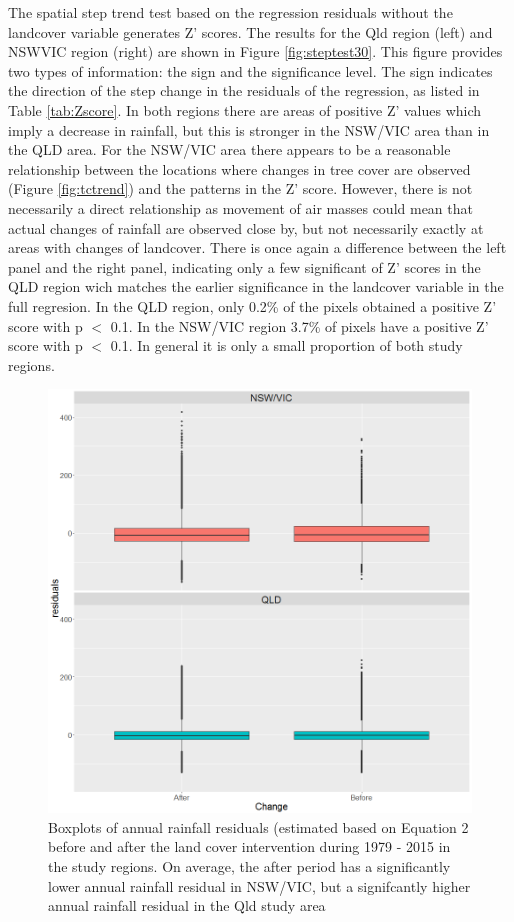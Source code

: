 \documentclass[fleqn,10pt,lineno]{wlpeerj} %
\begin{document}
The spatial step trend test based on the regression residuals without
the landcover variable generates Z' scores. The results for the Qld
region (left) and NSWVIC region (right) are shown in Figure
\ref{fig:steptest30}. This figure provides two types of information: the
sign and the significance level. The sign indicates the direction of the
step change in the residuals of the regression, as listed in Table
\ref{tab:Zscore}. In both regions there are areas of positive Z' values
which imply a decrease in rainfall, but this is stronger in the NSW/VIC
area than in the QLD area. For the NSW/VIC area there appears to be a
reasonable relationship between the locations where changes in tree
cover are observed (Figure \ref{fig:tctrend}) and the patterns in the Z'
score. However, there is not necessarily a direct relationship as
movement of air masses could mean that actual changes of rainfall are
observed close by, but not necessarily exactly at areas with changes of
landcover. There is once again a difference between the left panel and
the right panel, indicating only a few significant of Z' scores in the
QLD region wich matches the earlier significance in the landcover
variable in the full regresion. In the QLD region, only 0.2\% of the
pixels obtained a positive Z' score with p \(<\) 0.1. In the NSW/VIC
region 3.7\% of pixels have a positive Z' score with p \(<\) 0.1. In
general it is only a small proportion of both study regions.

\begin{figure}
\includegraphics[width=0.7\linewidth,height=0.7\textheight]{figures/ResidualBoxplotchange} \caption{Boxplots of annual rainfall residuals (estimated based on Equation 2 before and after the land cover intervention during 1979 - 2015 in the study regions. On average, the after period has a significantly lower annual rainfall residual in NSW/VIC, but a signifcantly higher annual rainfall residual in the Qld study area}\label{fig:meandiff}
\end{figure}
\end{document}
